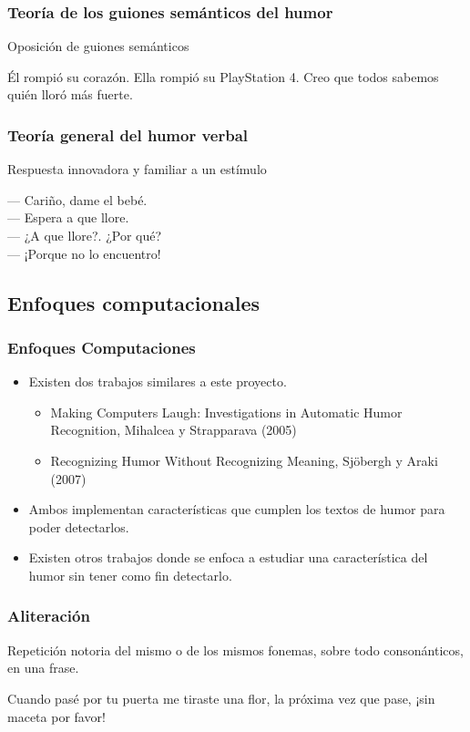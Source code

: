 \begin{frame}
\frametitle{Teoría de los guiones semánticos del humor}
    Oposición de guiones semánticos
    \begin{example}
        Él rompió su corazón. Ella rompió su PlayStation 4. Creo que todos sabemos quién lloró más fuerte.
    \end{example}
\end{frame}

\begin{frame}
\frametitle{Teoría general del humor verbal}
    Respuesta innovadora y familiar a un estímulo
    \begin{example}
        — Cariño, dame el bebé.\\
        — Espera a que llore.\\
        — ¿A que llore?. ¿Por qué?\\
        — ¡Porque no lo encuentro!\\
    \end{example}
\end{frame}

\subsection{Enfoques computacionales}
\begin{frame}
\frametitle{Enfoques Computaciones}
    \begin{itemize}
        \item Existen dos trabajos similares a este proyecto.
        \begin{itemize}
            \item Making Computers Laugh: Investigations in Automatic Humor Recognition, Mihalcea y Strapparava (2005)
            \item Recognizing Humor Without Recognizing Meaning, Sjöbergh y Araki (2007)
        \end{itemize}
        \item Ambos implementan características que cumplen los textos de humor para poder detectarlos.
        \item Existen otros trabajos donde se enfoca a estudiar una característica del humor sin tener como fin detectarlo.
    \end{itemize}
\end{frame}

\begin{frame}
\frametitle{Aliteración}
    Repetición notoria del mismo o de los mismos fonemas, sobre todo consonánticos, en una frase.
    \begin{example}
        Cuando pasé por tu puerta me tiraste una flor, la próxima vez que pase, ¡sin maceta por favor!
    \end{example}
\end{frame}

